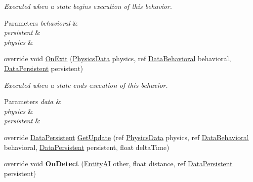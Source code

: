 \begin{DoxyCompactItemize}
\begin{DoxyCompactList}\small\item\em Executed when a state begins execution of this behavior. 


\begin{DoxyParams}{Parameters}
{\em behavioral} & \\
\hline
{\em persistent} & \\
\hline
{\em physics} & \\
\hline
\end{DoxyParams}
 \end{DoxyCompactList}\item 
\hypertarget{class_skyrates_1_1_a_i_1_1_composite_1_1_behavior_pipeline_3_01_t_01_4_a6a327bc5ea23b936b907301768b9a588}{override void \hyperlink{class_skyrates_1_1_a_i_1_1_composite_1_1_behavior_pipeline_3_01_t_01_4_a6a327bc5ea23b936b907301768b9a588}{On\-Exit} (\hyperlink{class_skyrates_1_1_physics_1_1_physics_data}{Physics\-Data} physics, ref \hyperlink{class_skyrates_1_1_a_i_1_1_behavior_1_1_data_behavioral}{Data\-Behavioral} behavioral, \hyperlink{class_skyrates_1_1_a_i_1_1_behavior_1_1_data_persistent}{Data\-Persistent} persistent)}\label{class_skyrates_1_1_a_i_1_1_composite_1_1_behavior_pipeline_3_01_t_01_4_a6a327bc5ea23b936b907301768b9a588}

\begin{DoxyCompactList}\small\item\em Executed when a state ends execution of this behavior. 


\begin{DoxyParams}{Parameters}
{\em data} & \\
\hline
{\em physics} & \\
\hline
{\em persistent} & \\
\hline
\end{DoxyParams}
 \end{DoxyCompactList}\item 
override \hyperlink{class_skyrates_1_1_a_i_1_1_behavior_1_1_data_persistent}{Data\-Persistent} \hyperlink{class_skyrates_1_1_a_i_1_1_composite_1_1_behavior_pipeline_3_01_t_01_4_ab55d0aedb4c743dae51f73520311eebf}{Get\-Update} (ref \hyperlink{class_skyrates_1_1_physics_1_1_physics_data}{Physics\-Data} physics, ref \hyperlink{class_skyrates_1_1_a_i_1_1_behavior_1_1_data_behavioral}{Data\-Behavioral} behavioral, \hyperlink{class_skyrates_1_1_a_i_1_1_behavior_1_1_data_persistent}{Data\-Persistent} persistent, float delta\-Time)
\item 
\hypertarget{class_skyrates_1_1_a_i_1_1_composite_1_1_behavior_pipeline_3_01_t_01_4_a8365b3c70f0167be0eb0f41167e2fb03}{override void {\bfseries On\-Detect} (\hyperlink{class_skyrates_1_1_entity_1_1_entity_a_i}{Entity\-A\-I} other, float distance, ref \hyperlink{class_skyrates_1_1_a_i_1_1_behavior_1_1_data_persistent}{Data\-Persistent} persistent)}\label{class_skyrates_1_1_a_i_1_1_composite_1_1_behavior_pipeline_3_01_t_01_4_a8365b3c70f0167be0eb0f41167e2fb03}

\end{DoxyCompactItemize}
